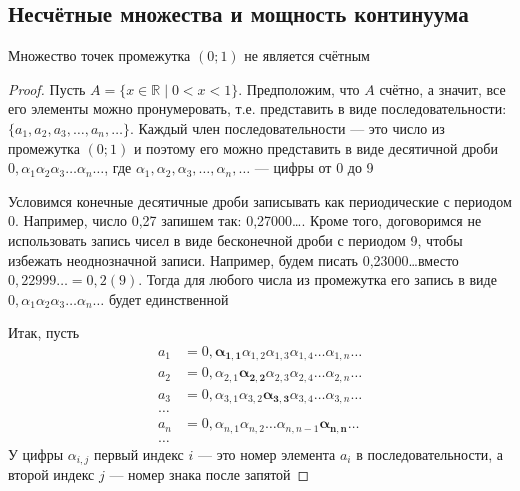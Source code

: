 \documentclass[a4paper,12pt]{article}
\theoremstyle{definition}
\theoremstyle{plain}
\theoremstyle{remark}
\begin{document}
	
	\subsection{Несчётные множества и мощность континуума}
		
	\bigskip
	\begin{tcolorbox}[colback=red!5, colframe=red!70!black, title=Теорема 3]
		Множество точек промежутка $(0; 1)$ не является счётным
	\end{tcolorbox}
	
	\begin{proof}
		Пусть $A = \{x \in \mathbb{R} \mid 0 < x < 1\}$. Предположим, что $A$ счётно, а значит, все его элементы можно пронумеровать, т.е. представить в виде последовательности: $\{a_1, a_2, a_3, \dots, a_n, \dots\}$.
		Каждый член последовательности — это число из промежутка $(0; 1)$ и поэтому его можно представить в виде десятичной дроби $0, \alpha_1 \alpha_2 \alpha_3 \dots \alpha_n \dots$, где $\alpha_1, \alpha_2, \alpha_3, \dots, \alpha_n, \dots$ — цифры от 0 до 9
		
		\medskip
		Условимся конечные десятичные дроби записывать как периодические с периодом 0. Например, число 0,27 запишем так: 0,27000\dots. Кроме того, договоримся не использовать запись чисел в виде бесконечной дроби с периодом 9, чтобы избежать неоднозначной записи. Например, будем писать 0,23000\dots вместо $0,22999\dots = 0,2(9)$. Тогда для любого числа из промежутка его запись в виде $0, \alpha_1 \alpha_2 \alpha_3 \dots \alpha_n \dots$ будет единственной
		
		\medskip
		Итак, пусть
		\begin{align*}
			a_1 &= 0, \mathbf{\alpha_{1,1}} \alpha_{1,2} \alpha_{1,3} \alpha_{1,4} \dots \alpha_{1,n} \dots \\
			a_2 &= 0, \alpha_{2,1} \mathbf{\alpha_{2,2}} \alpha_{2,3} \alpha_{2,4} \dots \alpha_{2,n} \dots \\
			a_3 &= 0, \alpha_{3,1} \alpha_{3,2} \mathbf{\alpha_{3,3}} \alpha_{3,4} \dots \alpha_{3,n} \dots \\
			\dots & \\
			a_n &= 0, \alpha_{n,1} \alpha_{n,2} \dots \alpha_{n,n-1} \mathbf{\alpha_{n,n}} \dots \\
			\dots & 
		\end{align*}
		У цифры $\alpha_{i, j}$ первый индекс $i$ — это номер элемента $a_i$ в последовательности, а второй индекс $j$ — номер знака после запятой
		

\end{proof}
\end{document}
